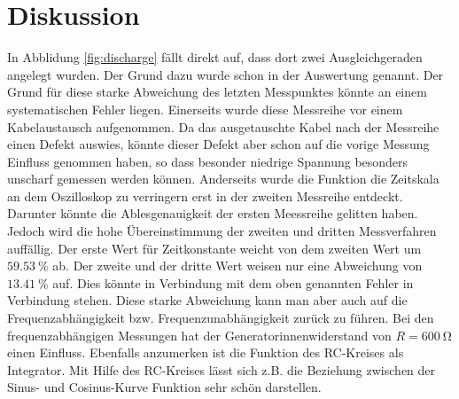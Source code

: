 \section{Diskussion}
\label{sec:Diskussion}
In Abblidung \ref{fig:discharge} fällt direkt auf, dass dort zwei Ausgleichgeraden angelegt wurden. Der Grund dazu wurde schon in der Auswertung genannt.
Der Grund für diese starke Abweichung des letzten Messpunktes könnte an einem systematischen Fehler liegen. Einerseits wurde diese Messreihe vor einem Kabelaustausch
aufgenommen. Da das ausgetauschte Kabel nach der Messreihe einen Defekt auswies, könnte dieser Defekt aber schon auf die vorige Messung Einfluss genommen haben, so dass
besonder niedrige Spannung besonders unscharf gemessen werden können.
Anderseits wurde die Funktion die Zeitskala an dem Oszilloskop zu verringern erst in der zweiten Messreihe entdeckt. Darunter könnte die Ablesgenauigkeit der ersten Meessreihe
gelitten haben.
Jedoch wird die hohe Übereinstimmung der zweiten und dritten Messverfahren auffällig. Der erste Wert für Zeitkonstante weicht von dem zweiten Wert
um $\SI{59.53}{\percent}$ ab. Der zweite und der dritte Wert weisen nur eine Abweichung von $\SI{13.41}{\percent}$ auf. Dies könnte in Verbindung mit dem oben genannten
Fehler in Verbindung stehen.
Diese starke Abweichung kann man aber auch auf die Frequenzabhängigkeit bzw. Frequenzunabhängigkeit zurück zu führen. Bei den frequenzabhängigen Messungen hat der
Generatorinnenwiderstand von $R = \SI{600}{\ohm}$ einen Einfluss.
Ebenfalls anzumerken ist die Funktion des RC-Kreises als Integrator. 
Mit Hilfe des RC-Kreises lässt sich z.B. die Beziehung zwischen der Sinus- und Cosinus-Kurve Funktion sehr schön darstellen.